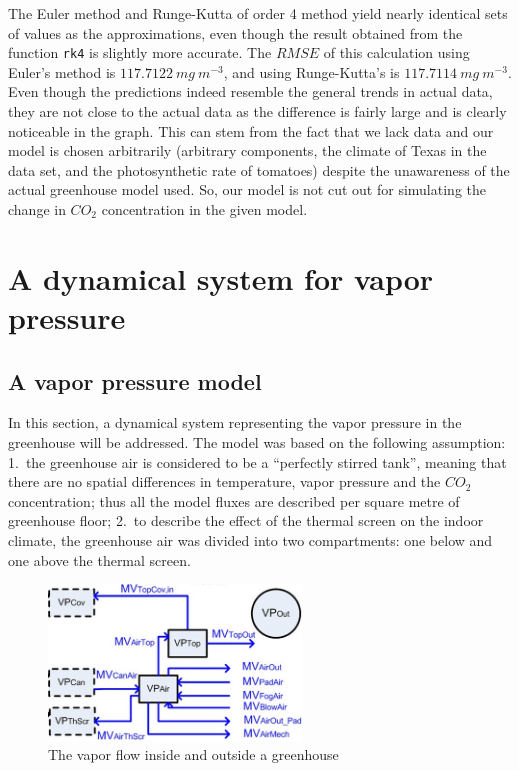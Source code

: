 \documentclass[a4paper]{article}
\numberwithin{equation}{section}
\begin{document}
The Euler method and Runge-Kutta of order 4 method yield nearly identical sets of values as the approximations, even though the result obtained from the function \texttt{rk4} is slightly more accurate. The \(RMSE\) of this calculation using Euler's method is \(117.7122\ mg\ m^{-3}\), and using Runge-Kutta's is \(117.7114\ mg\ m^{-3}\). Even though the predictions indeed resemble the general trends in actual data, they are not close to the actual data as the difference is fairly large and is clearly noticeable in the graph. This can stem from the fact that we lack data and our model is chosen arbitrarily (arbitrary components, the climate of Texas in the data set, and the photosynthetic rate of tomatoes) despite the unawareness of the actual greenhouse model used. So, our model is not cut out for simulating the change in \(CO_2\) concentration in the given model.

\newpage
\section{A dynamical system for vapor pressure}
\subsection{A vapor pressure model}
In this section, a dynamical system representing the vapor pressure in the greenhouse will be addressed.
The model was based on the following assumption:
1.\ the greenhouse air is considered to be a ``perfectly stirred tank'', meaning that there are no spatial differences in temperature, vapor pressure and the \(CO_2\) concentration; thus all the model fluxes are described per square metre of greenhouse floor;
2.\ to describe the effect of the thermal screen on the indoor climate, the greenhouse air was divided into two compartments: one below and one above the thermal screen.

\begin{figure}[H]
  \centering
  \includegraphics[width=0.6\textwidth]{VP}
  \caption{The vapor flow inside and outside a greenhouse}\label{fig:VP}
\end{figure}
\end{document}
